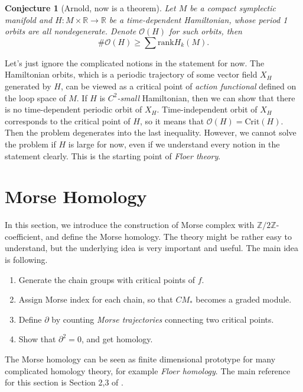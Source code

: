 \documentclass{article}
\newtheorem{conjecture}{Conjecture}
\newcommand{\Z}{\mathbb{Z}}
\newcommand{\R}{\mathbb{R}}
\newcommand{\pp}{\partial}
\newcommand{\Crit}{\mathrm{Crit}}
\newcommand{\rank}{\mathrm{rank}}
\begin{document}
	\begin{conjecture}[Arnold, now is a theorem]\rm
	Let $M$ be a compact symplectic manifold and $H:M\times\R\to\R$ be a time-dependent Hamiltonian, whose period 1 orbits are all nondegenerate.
	Denote $\mathcal{O}(H)$ for such orbits, then
		$$\#\mathcal{O}(H)\geq\sum\rank H_k(M).$$
	\end{conjecture}
Let's just ignore the complicated notions in the statement for now.
The Hamiltonian orbits, which is a periodic trajectory of some vector field $X_H$ generated by $H$, can be viewed as a critical point of \emph{action functional} defined on the loop space of $M$.
If $H$ is \emph{$C^2$-small} Hamiltonian, then we can show that there is no time-dependent periodic orbit of $X_H$.
Time-independent orbit of $X_H$ corresponds to the critical point of $H$, so it means that $\mathcal{O}(H)=\Crit(H)$.
Then the problem degenerates into the last inequality.
However, we cannot solve the problem if $H$ is large for now, even if we understand every notion in the statement clearly.
This is the starting point of \emph{Floer theory}.


\newpage
\section{Morse Homology}
In this section, we introduce the construction of Morse complex with $\Z/2\Z$-coefficient, and define the Morse homology.
The theory might be rather easy to understand, but the underlying idea is very important and useful.
The main idea is following.
	\begin{enumerate}
	\item Generate the chain groups with critical points of $f$.
	\item Assign Morse index for each chain, so that $CM_*$ becomes a graded module.
	\item Define $\pp$ by counting \emph{Morse trajectories} connecting two critical points.
	\item Show that $\pp^2=0$, and get homology.
	\end{enumerate}
The Morse homology can be seen as finite dimensional prototype for many complicated homology theory, for example \emph{Floer homology}.
The main reference for this section is Section 2,3 of \cite{ad}.
\end{document}
